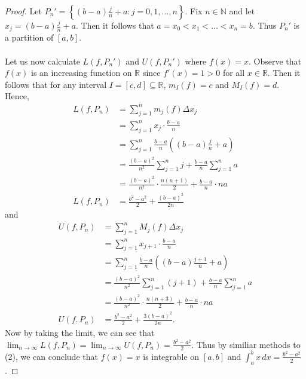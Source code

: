 \documentclass[ 12pt ]{article}
\begin{document}
\begin{enumerate}
	\begin{proof}
		Let $P_n' = \left \{ (b-a)\frac{j}{n} + a: j=0,1, \hdots, n \right \}$. Fix $n \in \mathbb{N}$ and let $x_j = (b-a)\frac{j}{n} + a$. Then it follows that $a=x_0<x_1<
		\hdots<x_n=b$. Thus $P_n'$ is a partition of $[a,b]$. \\ \\
		Let us now calculate $L(f, P_n')$ and $U(f, P_n')$ where $f(x) = x$. Observe that $f(x)$ is an increasing function on $\mathbb{R}$ since $f'(x) = 1 > 0$ for all
		$x \in \mathbb{R}$. Then it follows that for any interval $I=[c,d] \subseteq \mathbb{R}$, $m_I(f) = c$ and $M_I(f) = d$. Hence,
		\begin{align*}
			L(f, P_n) &= \sum_{j = 1}^n m_j(f) \Delta x_j \\
				&= \sum_{j = 1}^n x_j \cdot \frac{b-a}{n} \\
				&= \sum_{j = 1}^n \frac{b-a}{n} \left ( (b-a) \frac{j}{n} + a \right ) \\
				&= \frac{(b-a)^2}{n^2} \sum_{j = 1}^n j + \frac{b-a}{n} \sum_{j = 1}^n a \\
				&= \frac{(b-a)^2}{n^2} \cdot \frac{n(n+1)}{2} + \frac{b-a}{n} \cdot na \\
			L(f, P_n) &= \frac{b^2 - a^2}{2} + \frac{(b-a)^2}{2n}
		\end{align*}
		and
		\begin{align*}
			U(f, P_n) &= \sum_{j = 1}^n M_j(f) \Delta x_j \\
				&= \sum_{j = 1}^n x_{j+1} \cdot \frac{b-a}{n} \\
				&= \sum_{j = 1}^n \frac{b-a}{n} \left ( (b-a) \frac{j+1}{n} + a \right ) \\
				&= \frac{(b-a)^2}{n^2} \sum_{j = 1}^n (j+1) + \frac{b-a}{n} \sum_{j = 1}^n a \\
				&= \frac{(b-a)^2}{n^2} \cdot \frac{n(n+3)}{2} + \frac{b-a}{n} \cdot na \\
			U(f, P_n) &= \frac{b^2 - a^2}{2} + \frac{3(b-a)^2}{2n}.
		\end{align*}
		Now by taking the limit, we can see that $\lim_{n \rightarrow \infty} L(f, P_n) = \lim_{n \rightarrow \infty} U(f, P_n) = \frac{b^2 - a^2}{2}$. Thus by similiar
		methods to (2), we can conclude that $f(x) = x$ is integrable on $[a, b]$ and $\int_a^b x\,dx = \frac{b^2 - a^2}{2}$.
	\end{proof}
\end{enumerate}
\end{document}
